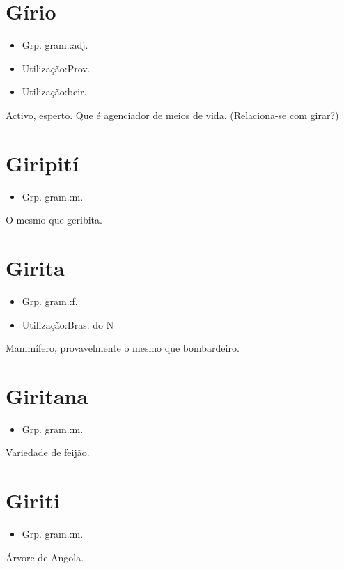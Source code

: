 \section{Gírio}
\begin{itemize}
\item {Grp. gram.:adj.}
\end{itemize}
\begin{itemize}
\item {Utilização:Prov.}
\end{itemize}
\begin{itemize}
\item {Utilização:beir.}
\end{itemize}
Activo, esperto.
Que é agenciador de meios de vida.
(Relaciona-se com \textunderscore girar\textunderscore ?)
\section{Giripití}
\begin{itemize}
\item {Grp. gram.:m.}
\end{itemize}
O mesmo que \textunderscore geribita\textunderscore .
\section{Girita}
\begin{itemize}
\item {Grp. gram.:f.}
\end{itemize}
\begin{itemize}
\item {Utilização:Bras. do N}
\end{itemize}
Mammífero, provavelmente o mesmo que \textunderscore bombardeiro\textunderscore .
\section{Giritana}
\begin{itemize}
\item {Grp. gram.:m.}
\end{itemize}
Variedade de feijão.
\section{Giriti}
\begin{itemize}
\item {Grp. gram.:m.}
\end{itemize}
Árvore de Angola.
